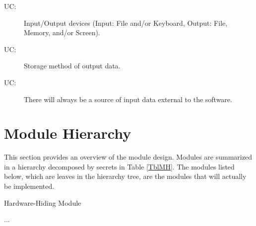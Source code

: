 \documentclass[12pt, titlepage]{article}
\newcounter{ucnum}
\newcommand{\uctheucnum}{UC\theucnum}
\newcounter{mnum}
\newcommand{\mthemnum}{M\themnum}
\begin{document}
\begin{description}
\item[ \uctheucnum \label{ucIO}:] Input/Output devices (Input: File and/or Keyboard, Output: File, Memory, and/or Screen).
\item[ \uctheucnum \label{ucInput}:] Storage method of output data.
\item[ \uctheucnum \label{ucInput}:] There will always be a source of input data external to the software.
\end{description}

\section{Module Hierarchy} \label{SecMH}
This section provides an overview of the module design. Modules are summarized
in a hierarchy decomposed by secrets in Table \ref{TblMH}. The modules listed
below, which are leaves in the hierarchy tree, are the modules that will
actually be implemented.

\begin{description}
\item [ \mthemnum \label{mHH}:] Hardware-Hiding Module
\item ...
\end{description}
\end{document}
